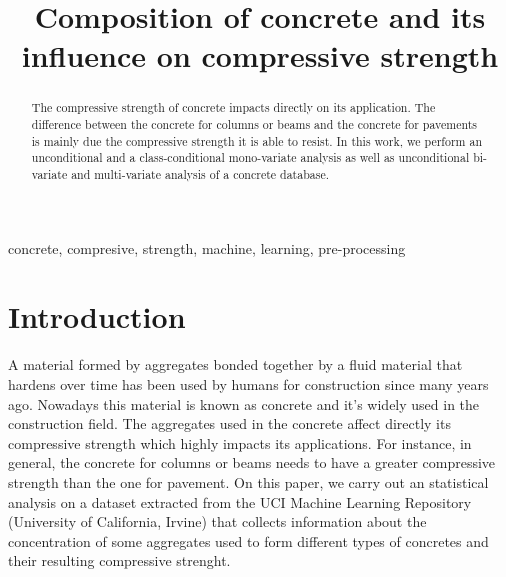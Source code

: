\documentclass[conference]{IEEEtran}
\begin{document}
\title{Composition of concrete and its influence on compressive strength\\
}

\author{
\and
{}
}

\maketitle

\begin{abstract}
The compressive strength of concrete impacts directly on its application. The difference between the concrete for columns or beams and the concrete for pavements is mainly due the compressive strength it is able to resist. In this work, we perform an unconditional and a class-conditional mono-variate analysis as well as unconditional bi-variate and multi-variate analysis of a concrete database.
\end{abstract}

\begin{IEEEkeywords}
concrete, compresive, strength, machine, learning, pre-processing
\end{IEEEkeywords}

\section{Introduction}
A material formed by aggregates bonded together by a fluid material that hardens over time has been used by humans for construction since many years ago\cite{b3}. Nowadays this material is known as concrete and it's widely used in the construction field. The aggregates used in the concrete affect directly its compressive strength which highly impacts its applications. For instance, in general, the concrete for columns or beams needs to have a greater compressive strength than the one for pavement. On this paper, we carry out an statistical analysis on a dataset extracted from the UCI Machine Learning Repository (University of California, Irvine) that collects information about the concentration of some aggregates used to form different types of concretes and their resulting compressive strenght. 
\end{document}
